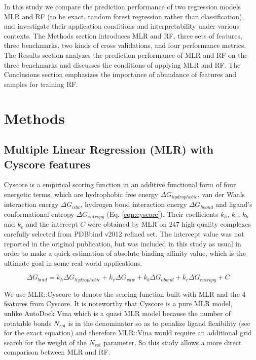 \documentclass[twocolumn]{bmcart}
\begin{document}
In this study we compare the prediction performance of two regression models MLR and RF (to be exact, random forest regression rather than classification), and investigate their application conditions and interpretability under various contexts. The Methods section introduces MLR and RF, three sets of features, three benchmarks, two kinds of cross validations, and four performance metrics. The Results section analyzes the prediction performance of MLR and RF on the three benchmarks and discusses the conditions of applying MLR and RF. The Conclusions section emphasizes the importance of abundance of features and samples for training RF.

\section*{Methods}

\subsection*{Multiple Linear Regression (MLR) with Cyscore features}

Cyscore is a empirical scoring function in an additive functional form of four energetic terms, which are hydrophobic free energy $\Delta G_{hydrophobic}$, van der Waals interaction energy $\Delta G_{vdw}$, hydrogen bond interaction energy $\Delta G_{hbond}$ and ligand's conformational entropy $\Delta G_{entropy}$ (Eq. \ref{eqn:cyscore}). Their coefficients $k_h$, $k_v$, $k_b$ and $k_e$ and the intercept $C$ were obtained by MLR on 247 high-quality complexes carefully selected from PDBbind v2012 refined set. The intercept value was not reported in the original publication, but was included in this study as usual \cite{1313} in order to make a quick estimation of absolute binding affinity value, which is the ultimate goal in some real-world applications.

\begin{equation}
\Delta G_{bind} = k_h\Delta G_{hydrophobic} + k_v\Delta G_{vdw} + k_b\Delta G_{hbond} + k_e\Delta G_{entropy} + C
\label{eqn:cyscore}
\end{equation}

We use MLR::Cyscore to denote the scoring function built with MLR and the 4 features from Cyscore. It is noteworthy that Cyscore is a pure MLR model, unlike AutoDock Vina \cite{595} which is a quasi MLR model because the number of rotatable bonds $N_{rot}$ is in the denominator so as to penalize ligand flexibility (see \cite{1362} for the exact equation) and therefore MLR::Vina would require an additional grid search for the weight of the $N_{rot}$ parameter. So this study allows a more direct comparison between MLR and RF.
\end{document}
